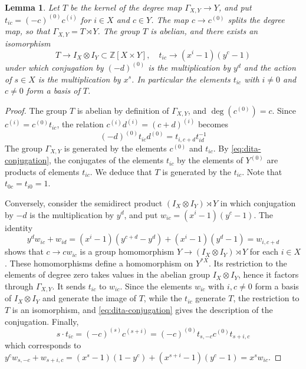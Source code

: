\documentclass[11pt,reqno]{amsart}
\newtheorem{lemma}[thm]{Lemma}
\theoremstyle{definition}
\numberwithin{equation}{section}
\begin{document}
\begin{lemma}\label{lem:dita-lattice}
Let $T$ be the kernel of the degree map $\Gamma_{X,Y}\to Y$, and put $t_{ic}=(-c)^{(0)}c^{(i)}$ for $i\in X$ and $c\in Y$. The map $c\to c^{(0)}$ splits the degree map, so that $\Gamma_{X,Y}=T\rtimes Y$. The group $T$ is abelian, and there exists an isomorphism
\begin{equation}\label{eq:dita-lattice}
T\to I_X\otimes I_Y\subset\mathbb Z[X\times Y],
\quad t_{ic}\to(x^i-1)(y^c-1)
\end{equation}
under which conjugation by $(-d)^{(0)}$ is the multiplication by $y^d$ and the action of $s\in X$ is the multiplication by $x^s$. In particular the elements $t_{ic}$ with $i\neq0$ and $c\neq0$ form a basis of $T$.
\end{lemma}

\begin{proof}
The group $T$ is abelian by definition of $\Gamma_{X,Y}$, and $\deg(c^{(0)})=c$. Since $c^{(i)}=c^{(0)}t_{ic}$, the relation $c^{(i)}d^{(i)}=(c+d)^{(i)}$ becomes
\begin{equation}\label{eq:dita-conjugation}
(-d)^{(0)}t_{ic}d^{(0)}=t_{i,c+d}t_{id}^{-1}
\end{equation}
The group $\Gamma_{X,Y}$ is generated by the elements $c^{(0)}$ and $t_{ic}$. By \eqref{eq:dita-conjugation}, the conjugates of the elements $t_{ic}$ by the elements of $Y^{(0)}$ are products of elements $t_{ic}$. We deduce that $T$ is generated by the $t_{ic}$. Note that $t_{0c}=t_{i0}=1$.

Conversely, consider the semidirect product $(I_X\otimes I_Y)\rtimes Y$ in which conjugation by $-d$ is the multiplication by $y^d$, and put $w_{ic}=(x^i-1)(y^c-1)$. The identity
$$y^d w_{ic}+w_{id}=(x^i-1)(y^{c+d}-y^d)+(x^i-1)(y^d-1)=w_{i,c+d}$$
shows that $c\to cw_{ic}$ is a group homomorphism $Y\to(I_X\otimes I_Y)\rtimes Y$ for each $i\in X$. These homomorphisms define a homomorphism on $Y^{*X}$. Its restriction to the elements of degree zero takes values in the abelian group $I_X\otimes I_Y$, hence it factors through $\Gamma_{X,Y}$. It sends $t_{ic}$ to $w_{ic}$. Since the elements $w_{ic}$ with $i,c\neq0$ form a basis of $I_X\otimes I_Y$ and generate the image of $T$, while the $t_{ic}$ generate $T$, the restriction to $T$ is an isomorphism, and \eqref{eq:dita-conjugation} gives the description of the conjugation. Finally,
$$s\cdot t_{ic}=(-c)^{(s)}c^{(s+i)}=(-c)^{(0)}t_{s,-c}c^{(0)}t_{s+i,c}$$
which corresponds to $y^cw_{s,-c}+w_{s+i,c}=(x^s-1)(1-y^c)+(x^{s+i}-1)(y^c-1)=x^sw_{ic}$.
\end{proof}
\end{document}

